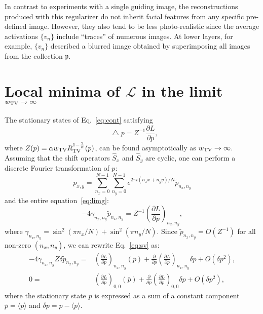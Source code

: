 \documentclass{article}
\def\Img{p}
\def\SetImgs{\mathfrak{p}}
\def\Reg{R}
\def\RegTV{\Reg_{\rm TV}}
\def\wtv{w_{\rm TV}}
\def\Av{v}
\newcommand{\op}[1]{\hat{#1}}
\def\ShiftOp{\op{S}}
\newcommand*\Laplace{\mathop{}\!\mathbin\bigtriangleup}
\newcommand{\avr}[1]{\langle #1 \rangle}
\newcommand{\mc}[1]{\mathcal{#1}}
\newcommand{\Eq}[1]{Eq.~\eqref{#1}}
\newcommand{\Fig}[1]{Fig.~\ref{#1}}
\newcommand{\pd}[2]{\frac{\partial #1}{\partial #2}}
\begin{document}
{    %
    In contrast to experiments with a single guiding image, the reconstructions produced with this regularizer do not inherit facial features from any specific pre-defined image.
    However, they also tend to be less photo-realistic since the average activations $\{\Av_n\}$ include ``traces'' of numerous images.
    At lower layers, for example, $\{\Av_n\}$ described a blurred image obtained by superimposing all images from the collection $\SetImgs$.

  \section{Local minima of $\mc{L}$ in the limit $\wtv\to \infty$}
  \label{sec:minima}

    The stationary states of \Eq{eq:cont} satisfying
    \begin{equation}
      \label{eq:limg}
      \Laplace \Img = Z^{-1} \pd{L}{\Img},
    \end{equation}
    where $Z(\Img)=\alpha \wtv \RegTV^{1-\frac{2}{\alpha}}(\Img)$, can be found asymptotically as $\wtv\to\infty$.
    Assuming that the shift operators $\ShiftOp_x$ and $\ShiftOp_y$ are cyclic, one can perform a discrete Fourier transformation of $\Img$:
    \begin{equation*}
      \Img_{x,y}=\sum_{n_x=0}^{N-1}\sum_{n_y=0}^{N-1} e^{2\pi i (n_x x + n_y y) / N} \tilde{\Img}_{n_x,n_y}
    \end{equation*}
    and the entire equation~\eqref{eq:limg}:
    \begin{equation}
      \label{eq:sv}
      -4 \gamma_{n_x,n_y} \tilde{\Img}_{n_x,n_y}
      =
      Z^{-1} \left(\pd{L}{\Img}\right)_{n_x,n_y},
    \end{equation}
    where $\gamma_{n_x,n_y} = \sin^2 \left( \pi n_x / N \right) + \sin^2 \left( \pi n_y / N \right)$.
    Since $\tilde{\Img}_{n_x,n_y} = O(Z^{-1})$ for all non-zero $(n_x,n_y)$, we can rewrite \Eq{eq:sv} as:
    \begin{align}
      \label{eq:sv1}
      - 4 \gamma_{n_x,n_y} Z \delta \tilde{\Img}_{n_x,n_y} =&
      \left(\pd{L}{\Img}\right)_{n_x,n_y} (\bar{\Img}) +
      \pd{}{\Img} \left(\pd{L}{\Img}\right)_{n_x,n_y} \delta \Img +
      O(\delta p^2), \\
      \label{eq:sv2}
      0 =&
      \left(\pd{L}{\Img}\right)_{0,0} (\bar{\Img}) + \pd{}{\Img} \left(\pd{L}{\Img}\right)_{0,0} \delta \Img + O(\delta p^2),
    \end{align}
    where the stationary state $\Img$ is expressed as a sum of a constant component $\bar{\Img}=\avr{\Img}$ and $\delta \Img=\Img-\avr{\Img}$.

}
\end{document}
